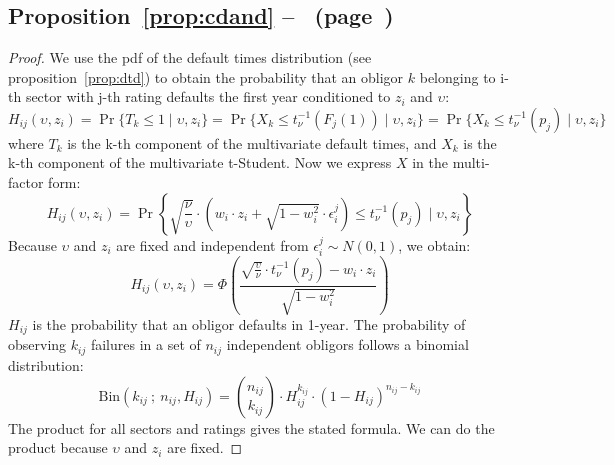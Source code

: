 \documentclass[11pt,fleqn]{book} %
\begin{document}
\section{}

\subsection{Proposition~\ref{prop:cdand} --~ (page~\pageref{prop:cdand})}
\begin{proof}
	We use the pdf of the default times distribution (see proposition~\ref{prop:dtd}) 
	to obtain the probability that an obligor $k$ belonging to i-th sector with j-th 
	rating defaults the first year conditioned to $z_i$ and $\upsilon$:
	\begin{displaymath}
		H_{ij}(\upsilon,z_i) = 
		\Pr\{T_k \le 1 \mid \upsilon, z_i\} = 
		\Pr\{ X_k \le t_{\nu}^{-1}(F_j(1)) \mid \upsilon, z_i\} = 
		\Pr\{ X_k \le t_{\nu}^{-1}(p_j) \mid \upsilon, z_i\}
	\end{displaymath}
	where $T_k$ is the k-th component of the multivariate default times, 
	and $X_k$ is the k-th component of the multivariate t-Student. 
	Now we express $X$ in the multi-factor form:
	\begin{displaymath}
		H_{ij}(\upsilon,z_i) = \Pr \left\{ 
		\sqrt{\frac{\nu}{\upsilon}} \cdot \left( w_i \cdot z_i + \sqrt{1-w_i^2} \cdot \epsilon_i^j\right)
		\le t_{\nu}^{-1}(p_j) \mid \upsilon, z_i
		\right\}
	\end{displaymath}
	Because $\upsilon$ and $z_i$ are fixed and independent from $\epsilon_i^j \sim N(0,1)$, we obtain:
	\begin{displaymath}
		H_{ij}(\upsilon,z_i) = \Phi\left(  
		\frac{\sqrt{\frac{\upsilon}{\nu}} \cdot t_{\nu}^{-1}(p_j) - w_i\cdot z_i}{\sqrt{1-w_i^2}}
		\right)
	\end{displaymath}
	$H_{ij}$ is the probability that an obligor defaults in 1-year. The 
	probability of observing $k_{ij}$ failures in a set of $n_{ij}$ independent
	obligors follows a binomial distribution:
	\begin{displaymath}
		\text{Bin}(k_{ij}\ ;\ n_{ij},H_{ij}) = 
		\binom{n_{ij}}{k_{ij}} \cdot H_{ij}^{k_{ij}} \cdot (1-H_{ij})^{n_{ij}-k_{ij}}
	\end{displaymath}
	The product for all sectors and ratings gives the stated formula. 
	We can do the product because $\upsilon$ and $z_i$ are fixed.
\end{proof}






\end{document}
